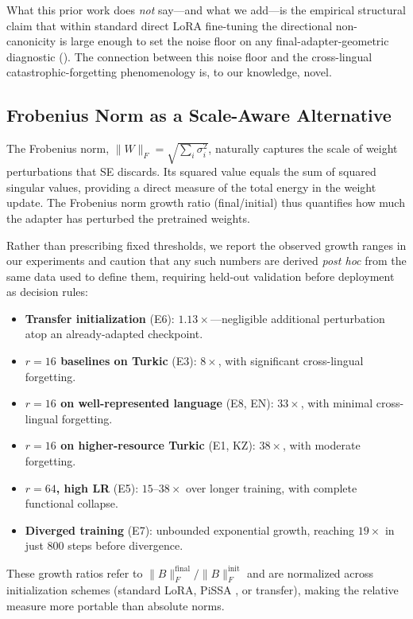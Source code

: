 \documentclass[11pt]{article}
\begin{document}
What this prior work does \emph{not} say---and what we add---is the empirical structural claim that within standard direct LoRA fine-tuning the directional non-canonicity is large enough to set the noise floor on any final-adapter-geometric diagnostic (). The connection between this noise floor and the cross-lingual catastrophic-forgetting phenomenology is, to our knowledge, novel.

\subsection{Frobenius Norm as a Scale-Aware Alternative}

The Frobenius norm, $\|W\|_F = \sqrt{\sum_i \sigma_i^2}$, naturally captures the scale of weight perturbations that SE discards. Its squared value equals the sum of squared singular values, providing a direct measure of the total energy in the weight update. The Frobenius norm growth ratio (final/initial) thus quantifies how much the adapter has perturbed the pretrained weights.

Rather than prescribing fixed thresholds, we report the observed growth ranges in our experiments and caution that any such numbers are derived \emph{post hoc} from the same data used to define them, requiring held-out validation before deployment as decision rules:
\begin{itemize}
    \item \textbf{Transfer initialization} (E6): $1.13\times$---negligible additional perturbation atop an already-adapted checkpoint.
    \item \textbf{$r{=}16$ baselines on Turkic} (E3): $8\times$, with significant cross-lingual forgetting.
    \item \textbf{$r{=}16$ on well-represented language} (E8, EN): $33\times$, with minimal cross-lingual forgetting.
    \item \textbf{$r{=}16$ on higher-resource Turkic} (E1, KZ): $38\times$, with moderate forgetting.
    \item \textbf{$r{=}64$, high LR} (E5): $15$--$38\times$ over longer training, with complete functional collapse.
    \item \textbf{Diverged training} (E7): unbounded exponential growth, reaching $19\times$ in just 800 steps before divergence.
\end{itemize}

These growth ratios refer to $\|B\|_F^{\text{final}}/\|B\|_F^{\text{init}}$ and are normalized across initialization schemes (standard LoRA, PiSSA \cite{meng2024pissa}, or transfer), making the relative measure more portable than absolute norms.
\end{document}
